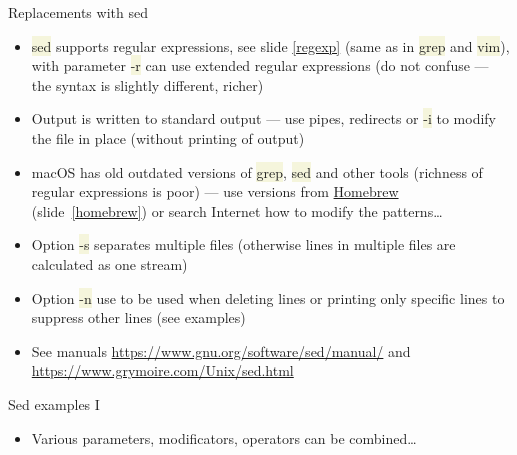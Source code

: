 \documentclass[compress, ucs, xelatex, 11pt, xcolor=svgnames, aspectratio=169,
	hyperref={
		bookmarks=true,
		unicode=true,
		colorlinks=true,
		pdftitle={Linux, command line and MetaCentrum},
		plainpages=false,
		pdfauthor={Vojtech Zeisek},
		pdfsubject={Course about use of Linux command line, writing shell scripts and using MetaCentrum of CESNET},
		pdfcreator={XeLaTeX},
		pdfkeywords={Linux, GNU, BASH, shell, command line, MetaCentrum},
		linkcolor=DarkRed, %
		anchorcolor=DarkBlue, %
		citecolor=Indigo, %
		filecolor=NavyBlue, %
		menucolor=DarkMagenta, %
		urlcolor=DarkBlue, %
		pdftex},
	url={hyphens, lowtilde} %
	]{beamer}
\renewcommand{\texttt}[1]{\colorbox{Beige}{{\ttfamily #1}}}
\begin{document}
\begin{frame}{Replacements with sed}
	\begin{itemize}
		\item \texttt{sed} supports regular expressions, see slide \ref{regexp} (same as in \texttt{grep} and \texttt{vim}), with parameter \texttt{-r} can use extended regular expressions (do not confuse --- the syntax is slightly different, richer)
		\item Output is written to standard output --- use pipes, redirects or \texttt{-i} to modify the file in place (without printing of output)
		\item macOS has old outdated versions of \texttt{grep}, \texttt{sed} and other tools (richness of regular expressions is poor) --- use versions from \href{http://brew.sh/}{Homebrew} (slide~\ref{homebrew}) or search Internet how to modify the patterns\ldots
		\item Option \texttt{-s} separates multiple files (otherwise lines in multiple files are calculated as one stream)
		\item Option \texttt{-n} use to be used when deleting lines or printing only specific lines to suppress other lines (see examples)
		\item See manuals \url{https://www.gnu.org/software/sed/manual/} and \url{https://www.grymoire.com/Unix/sed.html}
	\end{itemize}
\end{frame}

\begin{frame}[fragile]{Sed examples I}
	\label{sedex}
	\begin{itemize}
		\item Various parameters, modificators, operators can be combined\ldots
	\end{itemize}
\end{frame}
\end{document}
